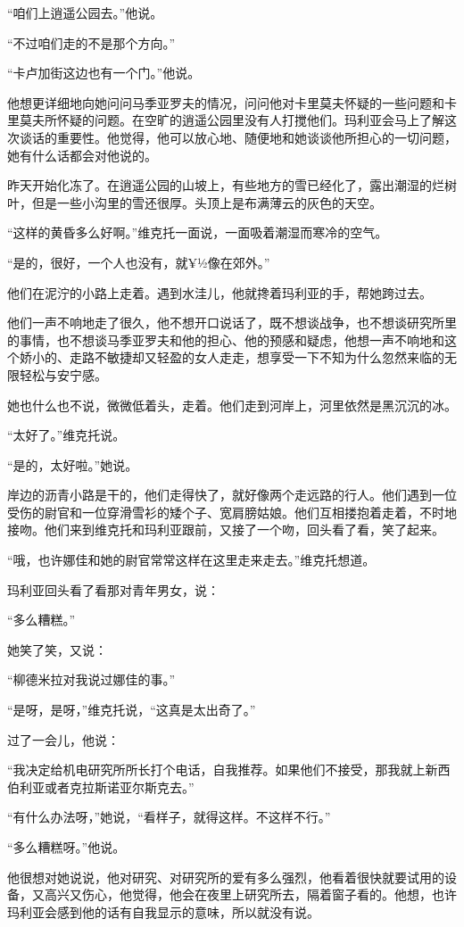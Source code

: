 “咱们上逍遥公园去。”他说。

“不过咱们走的不是那个方向。”

“卡卢加街这边也有一个门。”他说。

他想更详细地向她问问马季亚罗夫的情况，问问他对卡里莫夫怀疑的一些问题和卡里莫夫所怀疑的问题。在空旷的逍遥公园里没有人打搅他们。玛利亚会马上了解这次谈话的重要性。他觉得，他可以放心地、随便地和她谈谈他所担心的一切问题，她有什么话都会对他说的。

昨天开始化冻了。在逍遥公园的山坡上，有些地方的雪已经化了，露出潮湿的烂树叶，但是一些小沟里的雪还很厚。头顶上是布满薄云的灰色的天空。

“这样的黄昏多么好啊。”维克托一面说，一面吸着潮湿而寒冷的空气。

“是的，很好，一个人也没有，就¥½像在郊外。”

他们在泥泞的小路上走着。遇到水洼儿，他就搀着玛利亚的手，帮她跨过去。

他们一声不响地走了很久，他不想开口说话了，既不想谈战争，也不想谈研究所里的事情，也不想谈马季亚罗夫和他的担心、他的预感和疑虑，他想一声不响地和这个娇小的、走路不敏捷却又轻盈的女人走走，想享受一下不知为什么忽然来临的无限轻松与安宁感。

她也什么也不说，微微低着头，走着。他们走到河岸上，河里依然是黑沉沉的冰。

“太好了。”维克托说。

“是的，太好啦。”她说。

岸边的沥青小路是干的，他们走得快了，就好像两个走远路的行人。他们遇到一位受伤的尉官和一位穿滑雪衫的矮个子、宽肩膀姑娘。他们互相搂抱着走着，不时地接吻。他们来到维克托和玛利亚跟前，又接了一个吻，回头看了看，笑了起来。

“哦，也许娜佳和她的尉官常常这样在这里走来走去。”维克托想道。

玛利亚回头看了看那对青年男女，说：

“多么糟糕。”

她笑了笑，又说：

“柳德米拉对我说过娜佳的事。”

“是呀，是呀，”维克托说，“这真是太出奇了。”

过了一会儿，他说：

“我决定给机电研究所所长打个电话，自我推荐。如果他们不接受，那我就上新西伯利亚或者克拉斯诺亚尔斯克去。”

“有什么办法呀，”她说，“看样子，就得这样。不这样不行。”

“多么糟糕呀。”他说。

他很想对她说说，他对研究、对研究所的爱有多么强烈，他看着很快就要试用的设备，又高兴又伤心，他觉得，他会在夜里上研究所去，隔着窗子看的。他想，也许玛利亚会感到他的话有自我显示的意味，所以就没有说。

